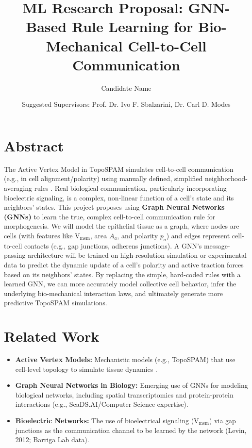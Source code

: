 \documentclass{article}
\title{ML Research Proposal: GNN-Based Rule Learning for Bio-Mechanical Cell-to-Cell Communication}
\author{Candidate Name}
\date{Suggested Supervisors: Prof. Dr. Ivo F. Sbalzarini, Dr. Carl D. Modes}
\begin{document}
\maketitle

\section*{Abstract}
The Active Vertex Model in TopoSPAM simulates cell-to-cell communication (e.g., in cell alignment/polarity) using manually defined, simplified neighborhood-averaging rules \cite{1}. Real biological communication, particularly incorporating bioelectric signaling, is a complex, non-linear function of a cell's state and its neighbors' states. This project proposes using \textbf{Graph Neural Networks (GNNs)} to learn the true, complex cell-to-cell communication rule for morphogenesis. We will model the epithelial tissue as a graph, where nodes are cells (with features like $\text{V}_{\text{mem}}$, area $A_a$, and polarity $p_a$) and edges represent cell-to-cell contacts (e.g., gap junctions, adherens junctions). A GNN's message-passing architecture will be trained on high-resolution simulation or experimental data to predict the dynamic update of a cell's polarity and active traction forces based on its neighbors' states. By replacing the simple, hard-coded rules with a learned GNN, we can more accurately model collective cell behavior, infer the underlying bio-mechanical interaction laws, and ultimately generate more predictive TopoSPAM simulations.

\section*{Related Work}
\begin{itemize}
    \item \textbf{Active Vertex Models:} Mechanistic models (e.g., TopoSPAM) that use cell-level topology to simulate tissue dynamics \cite{1}.
    \item \textbf{Graph Neural Networks in Biology:} Emerging use of GNNs for modeling biological networks, including spatial transcriptomics and protein-protein interactions (e.g., ScaDS.AI/Computer Science expertise).
    \item \textbf{Bioelectric Networks:} The use of bioelectrical signaling ($\text{V}_{\text{mem}}$) via gap junctions as the communication channel to be learned by the network (Levin, 2012; Barriga Lab data).
\end{itemize}
\end{document}
